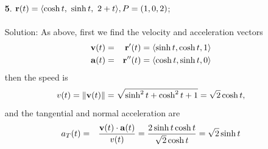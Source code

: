 \documentclass[12pt]{amsbook}
\newcommand{\la}{\langle}
\newcommand{\ra}{\rangle}
\begin{document}
\begin{enumerate}
  \\
  \\
  {\sc Solution}: As above, first we find the velocity and acceleration vectors
  \begin{eqnarray*}
  {\bf v}(t)&=&{\bf r}'(t)=\la \frac{1}{t}, \frac{1}{2t^{1/2}}, 2t \ra\\
  {\bf a}(t)&=&{\bf r}''(t)=\la -\frac{1}{t^2}, -\frac{1}{4t^{3/2}}, 2 \ra 
  \end{eqnarray*}
  then the speed is
  $$v(t)=\|{\bf v}(t)\|=\sqrt{1/t^2+1/(4t)+4t^2},$$
  and the tangential and normal acceleration are
\begin{eqnarray*}
  a_T(t)&=&\frac{{\bf v}(t)\cdot{\bf a}(t)}{v(t)}=\frac{-1/t^3-1/(8t^2)+4t}{\sqrt{1/t^2+1/(4t)+4t^2}}\\
  a_N(t)&=&\frac{\|{\bf v}(t)\times{\bf a}(t)\|}{v(t)}=\frac{\|\la 3/(2t^{1/2}),-4/t,1/(4t^{5/2}) \ra\|}{\sqrt{1/t^2+1/(4t)+4t^2}}=\frac{\sqrt{9/(4t)+16/t^2+1/(16t^5)}}{\sqrt{1/t^2+1/(4t)+4t^2}}
\end{eqnarray*}  
The point $P=(0,1,1)$ corresponds to $t=1$. The values of the specified functions at this $t$ are
\begin{eqnarray*}
{\bf v}(1)&=&\la 1, \frac{1}{2}, 2 \ra\\
{\bf a}(1)&=&\la -1, -\frac{1}{4}, 2 \ra  \\
v(1)&=&\sqrt{1+1/4+4}=\frac{1}{2}\sqrt{21}\\
a_T(1)&=&\frac{23}{4\sqrt{21}}\\
\end{eqnarray*}
\begin{eqnarray*}
a_N(1)&=&\frac{\sqrt{293}}{2\sqrt{21}}
\end{eqnarray*}
  \item[{\small\bf 5}.] ${\bf r}(t)=\la \cosh t ,\ \sinh t ,\ 2+t \ra, P=(1,0,2)$;
  \\
  \\
  {\sc Solution}: As above, first we find the velocity and acceleration vectors
  \begin{eqnarray*}
  {\bf v}(t)&=&{\bf r}'(t)=\la \sinh t, \cosh t, 1 \ra\\
  {\bf a}(t)&=&{\bf r}''(t)=\la \cosh t , \sinh t, 0 \ra 
  \end{eqnarray*}
  then the speed is
  $$v(t)=\|{\bf v}(t)\|=\sqrt{\sinh^2t+\cosh^2t+1}=\sqrt{2}\cosh t,$$
  and the tangential and normal acceleration are
\begin{eqnarray*}
  a_T(t)&=&\frac{{\bf v}(t)\cdot{\bf a}(t)}{v(t)}=\frac{2\sinh t \cosh t}{\sqrt{2}\cosh t}=\sqrt{2}\sinh t\\

\end{eqnarray*}
\end{enumerate}
\end{document}
